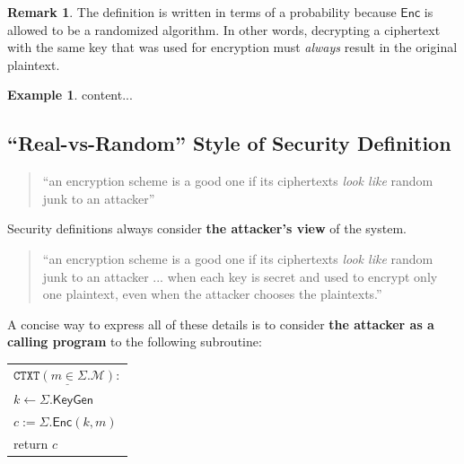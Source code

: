 \documentclass[12pt,openany]{book}
\theoremstyle{definition}
\newtheorem{remark}{Remark}[chapter]
\newtheorem{example}{Example}[chapter]
\newcommand{\KeyGen}{\mathsf{KeyGen}}
\newcommand{\Enc}{\mathsf{Enc}}
\newcommand{\scheme}{\Sigma}
\newcommand{\messagespace}{\mathcal{M}}
\newcommand{\tab}{\hspace{8pt}}
\begin{document}
	\begin{remark}
		The definition is written in terms of a probability because $\Enc$ is allowed to be a randomized algorithm. In other words, decrypting a ciphertext with the same key that was used for encryption must \textit{always} result in the original plaintext.
	\end{remark}
	\vspace{4pt}
	\begin{example}
		content...
	\end{example}
	
	\subsection{``Real-vs-Random'' Style of Security Definition}
	\begin{quote}
		``an encryption scheme is a good one if its ciphertexts \textit{look like} random junk to an attacker''
	\end{quote}

	Security definitions always consider \textbf{the attacker's view} of the system.
	\begin{quote}
		``an encryption scheme is a good one if its ciphertexts \textit{look like} random junk to an attacker ... when each key is secret and used to encrypt only one plaintext, even when the attacker chooses the plaintexts.''
	\end{quote}

	
	A concise way to express all of these details is to consider \textbf{the attacker as a calling	program} to the following subroutine:
	\begin{center}
		\begin{tabular}{|l|}
			\hline
			$\underline{\texttt{CTXT}(m\in\scheme.\messagespace):}$\\
			\tab$k\gets\scheme.\KeyGen$\\
			\tab$c:=\scheme.\Enc(k,m)$\\
			\tab return $c$\\
			\hline
		\end{tabular}\\
	\end{center}
	
\end{document}
